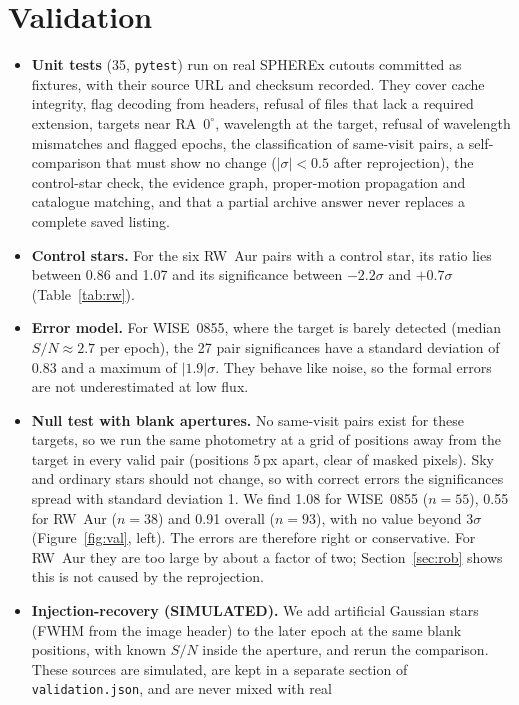 \documentclass[11pt,a4paper]{article}
\begin{document}
\section{Validation}\label{sec:val}
\begin{itemize}\setlength\itemsep{1pt}
\item \textbf{Unit tests} (35, \texttt{pytest}) run on real SPHEREx cutouts committed as fixtures, with their source
URL and checksum recorded. They cover cache integrity, flag decoding from headers, refusal of files that lack a
required extension, targets near RA~$0^\circ$, wavelength at the target, refusal of wavelength mismatches and flagged
epochs, the classification of same-visit pairs, a self-comparison that must show no change ($|\sigma|<0.5$ after
reprojection), the control-star check, the evidence graph, proper-motion propagation and catalogue matching, and that a partial archive answer never replaces a
complete saved listing.
\item \textbf{Control stars.} For the six RW~Aur pairs with a control star, its ratio lies between 0.86 and 1.07 and
its significance between $-2.2\sigma$ and $+0.7\sigma$ (Table~\ref{tab:rw}).
\item \textbf{Error model.} For WISE~0855, where the target is barely detected (median $S/N\approx2.7$ per epoch), the
27 pair significances have a standard deviation of 0.83 and a maximum of $|1.9|\sigma$. They behave like noise, so
the formal errors are not underestimated at low flux.
\item \textbf{Null test with blank apertures.} No same-visit pairs exist for these targets, so we run the same
photometry at a grid of positions away from the target in every valid pair (positions $5$\,px apart, clear of masked
pixels). Sky and ordinary stars should not change, so with correct errors the significances spread with standard
deviation 1. We find 1.08 for WISE~0855 ($n=55$), 0.55 for RW~Aur ($n=38$) and 0.91 overall ($n=93$), with no value
beyond $3\sigma$ (Figure~\ref{fig:val}, left). The errors are therefore right or conservative. For RW~Aur they are
too large by about a factor of two; Section~\ref{sec:rob} shows this is not caused by the reprojection.
\item \textbf{Injection-recovery (SIMULATED).} We add artificial Gaussian stars (FWHM from the image header) to the
later epoch at the same blank positions, with known $S/N$ inside the aperture, and rerun the comparison. These
sources are simulated, are kept in a separate section of \texttt{validation.json}, and are never mixed with real

\end{itemize}
\end{document}
